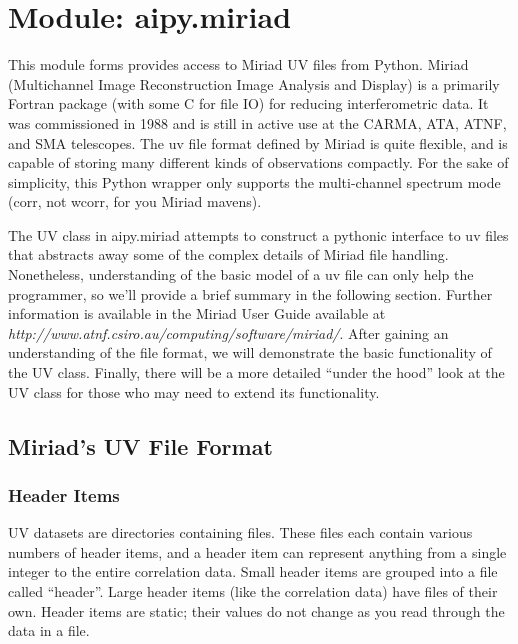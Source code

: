 \section{Module: aipy.miriad}
\label{sec:intro}

This module forms provides access to Miriad UV files from Python.  Miriad
(Multichannel Image Reconstruction Image Analysis and Display) is
a primarily Fortran package (with some C for file IO) for reducing
interferometric data.  It was commissioned in 1988 and is still in active
use at the CARMA, ATA, ATNF, and SMA telescopes.  The 
uv file format defined by Miriad is quite flexible, and is capable of storing
many different kinds of observations compactly.  For the sake of simplicity,
this Python wrapper only supports the multi-channel spectrum mode (corr,
not wcorr, for you Miriad mavens).  

The UV class in aipy.miriad attempts to construct a pythonic interface to uv
files that abstracts away some of the complex details of Miriad file handling.
Nonetheless, understanding of the basic model of a uv file can only help the
programmer, so we'll provide a brief summary in the following section.  Further
information is available in the Miriad User Guide available at {\it
http://www.atnf.csiro.au/computing/software/miriad/}.  After gaining an
understanding of the file format, we will demonstrate the basic functionality
of the UV class.  Finally, there will be a more detailed ``under the hood''
look at the UV class for those who may need to extend its functionality.

\subsection{Miriad's UV File Format}

\subsubsection{Header Items}
UV datasets are directories containing files.  These files each contain
various numbers of header items, and a header item can represent anything from
a single integer to the entire correlation data.  Small header items are
grouped into a file called ``header''.  Large header items (like the
correlation data) have files of their own.  Header items are static;
their values do not change as you read through the data in a file.

